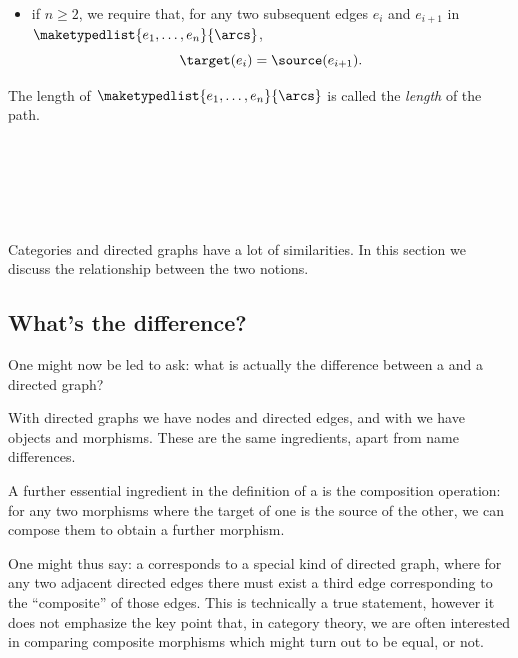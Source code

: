 {\begin{ctdefinition}[Paths]
    \condit

    \begin{itemize}
        \item if $n \geq 2$, we require that, for any two subsequent edges $e_i$ and $e_{i+1}$ in $\maketypedlist{e_1, \dots, e_n}{\arcs}$,
              \begin{equation}
                  \target(e_i) = \source(e_{i+1}).
              \end{equation}
    \end{itemize}
    The length of $\maketypedlist{e_1, \dots, e_n}{\arcs}$ is called the \emph{length} of the path.
\end{ctdefinition}

\ 

\ 

\

Categories and directed graphs have a lot of similarities. In this section we discuss the relationship between the two notions. 

\subsection{What's the difference?}

One might now be led to ask: what is actually the difference between a  and a directed graph?

With directed graphs we have nodes and directed edges, and with  we have objects and morphisms.
These are the same ingredients, apart from name differences.

A further essential ingredient in the definition of a  is the composition operation: for any two morphisms where the target of one is the source of the other, we can compose them to obtain a further morphism.

One might thus say: a  corresponds to a special kind of directed graph, where for any two adjacent directed edges there must exist a third edge corresponding to the ``composite'' of those edges.
This is technically a true statement, however it does not emphasize the key point that, in category theory, we are often interested in comparing composite morphisms which might turn out to be equal, or not.


}
